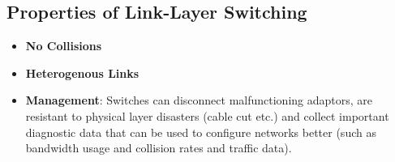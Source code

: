 \documentclass[a4paper]{article}
\theoremstyle{plain}
\theoremstyle{definition}
\begin{document}
\subsection{Properties of Link-Layer Switching}
\begin{itemize}
    \item \textbf{No Collisions}
    
    \item \textbf{Heterogenous Links}
    
    \item \textbf{Management}: Switches can disconnect malfunctioning adaptors, are resistant to physical layer disasters (cable cut etc.) and collect important diagnostic data that can be used to configure networks better (such as bandwidth usage and collision rates and traffic data). 
\end{itemize}
\end{document}
